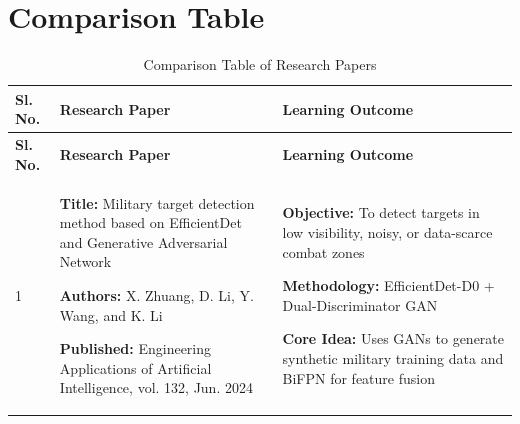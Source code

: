 \section{Comparison Table}
\renewcommand{\arraystretch}{1.5}
\begin{center}
    \begin{longtable}{
        |>{\centering\arraybackslash}p{1.22cm}
        |>{\raggedright\arraybackslash}p{6.3cm}
        |>{\raggedright\arraybackslash}p{6.3cm}|
        }

        \caption{Comparison Table of Research Papers}                                                                                                                                                    \\

        \hline
        \textbf{Sl. No.}                                                                             & \textbf{Research Paper} & \textbf{Learning Outcome}                                               \\
        \hline
        \endfirsthead

        \hline
        \textbf{Sl. No.}                                                                             & \textbf{Research Paper} & \textbf{Learning Outcome}                                               \\
        \hline
        \endhead
        \endlastfoot

        1                                                                                            &
        \textbf{Title:} Military target detection method based on EfficientDet and Generative Adversarial Network \par
        \textbf{Authors:} X. Zhuang, D. Li, Y. Wang, and K. Li \par
        \textbf{Published:} Engineering Applications of Artificial Intelligence, vol. 132, Jun. 2024 &
        \textbf{Objective:} To detect targets in low visibility, noisy, or data-scarce combat zones \par
        \textbf{Methodology:} EfficientDet-D0 + Dual-Discriminator GAN \par
        \textbf{Core Idea:} Uses GANs to generate synthetic military training data and BiFPN for feature fusion                                                                                          \\
        \hline


\end{longtable}
\end{center}
